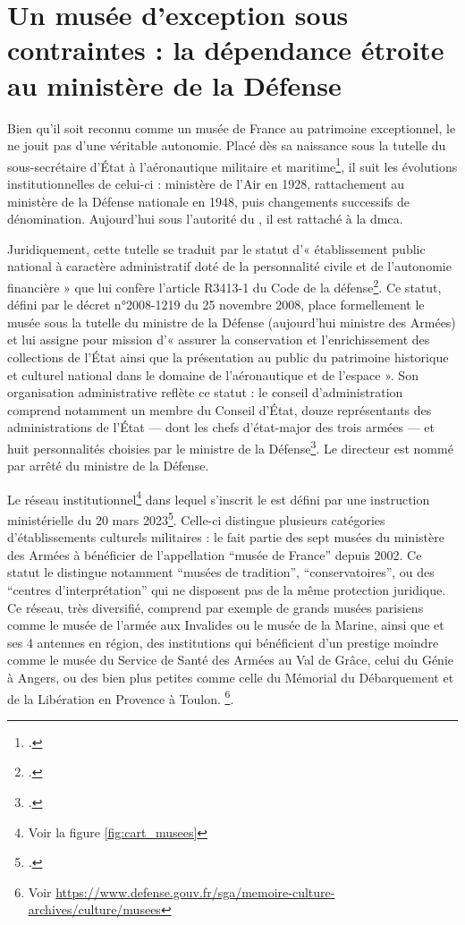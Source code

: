 \section{\label{I-B-1}Un musée d'exception sous contraintes : la dépendance étroite au ministère de la Défense}

Bien qu'il soit reconnu comme un musée de France au patrimoine exceptionnel, le \mae ne jouit pas d'une véritable autonomie. Placé dès sa naissance sous la tutelle du sous-secrétaire d'État à l'aéronautique militaire et maritime\footcite{terrierAeroportParisBourget2019}, il suit les évolutions institutionnelles de celui-ci : ministère de l'Air en 1928, rattachement au ministère de la Défense nationale en 1948, puis changements successifs de dénomination. Aujourd'hui sous l'autorité du \minarm, il est rattaché à la \gls{dmca}.

Juridiquement, cette tutelle se traduit par le statut d'« établissement public national à caractère administratif doté de la personnalité civile et de l'autonomie financière » que lui confère l'article R3413-1 du Code de la défense\footcite{ArticleR34131Code2008}. Ce statut, défini par le décret n°2008-1219 du 25 novembre 2008, place formellement le musée sous la tutelle du ministre de la Défense (aujourd'hui ministre des Armées) et lui assigne pour mission d'« assurer la conservation et l'enrichissement des collections de l'État ainsi que la présentation au public du patrimoine historique et culturel national dans le domaine de l'aéronautique et de l'espace ». Son organisation administrative reflète ce statut : le conseil d'administration comprend notamment un membre du Conseil d'État, douze représentants des administrations de l'État — dont les chefs d'état-major des trois armées — et huit personnalités choisies par le ministre de la Défense\footcite{ArticleR341373Code2013}. Le directeur est nommé par arrêté du ministre de la Défense.

Le réseau institutionnel\footnote{Voir la figure \ref{fig:cart_musees}} dans lequel s'inscrit le \mae est défini par une instruction ministérielle du 20 mars 2023\footcite{ministeredesarmeesInstructionNdeg303ARM2023}.
Celle-ci distingue plusieurs catégories d'établissements culturels militaires : le \mae fait partie des sept musées du ministère des Armées à bénéficier de l'appellation \enquote{musée de France} depuis 2002. Ce statut le distingue notamment \enquote{musées de tradition}, \enquote{conservatoires}, ou des \enquote{centres d'interprétation} qui ne disposent pas de la même protection juridique. Ce réseau, très diversifié, comprend par exemple de grands musées parisiens comme le musée de l'armée aux Invalides ou le musée de la Marine, ainsi que et ses 4 antennes en région, des institutions qui bénéficient d'un prestige moindre comme le musée du Service de Santé des Armées au Val de Grâce, celui du Génie à Angers, ou des bien plus petites comme celle du Mémorial du Débarquement et de la Libération en Provence à Toulon.
\footnote{Voir \url{https://www.defense.gouv.fr/sga/memoire-culture-archives/culture/musees}}.


